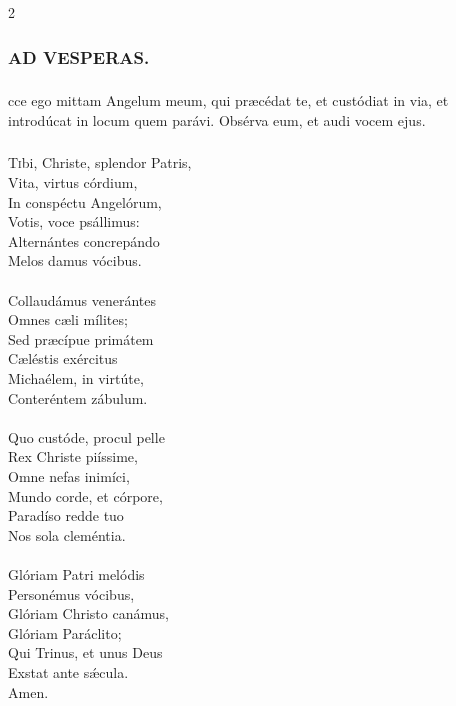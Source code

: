 \documentclass[9pt,twoside]{extarticle}
\begin{document}
\begin{multicols}{2}
\subsubsection*{\center {}}


\subsubsection*{\center \textsc{AD VESPERAS.}}
\subsubsection*{}
cce ego mittam Angelum meum, qui præcédat te, et custódiat in via, et introdúcat in locum quem parávi. Obsérva eum, et audi vocem ejus.

\subsubsection*{\center {}}
\lettrine{T}ibi, Christe, splendor Patris,\\
Vita, virtus córdium,\\
In conspéctu Angelórum,\\
Votis, voce psállimus:\\
Alternántes concrepándo\\
Melos damus vócibus.\\
\\
Collaudámus venerántes\\
Omnes cæli mílites;\\
Sed præcípue primátem\\
Cæléstis exércitus\\
Michaélem, in virtúte,\\
Conteréntem zábulum.\\
\\
Quo custóde, procul pelle\\
Rex Christe piíssime,\\
Omne nefas inimíci,\\
Mundo corde, et córpore,\\
Paradíso redde tuo\\
Nos sola cleméntia.\\
\\
Glóriam Patri melódis\\
Personémus vócibus,\\
Glóriam Christo canámus,\\
Glóriam Paráclito;\\
Qui Trinus, et unus Deus\\
Exstat ante sǽcula.\\
Amen.


\end{multicols}
\end{document}
